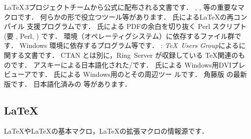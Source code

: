 \begin{KI}
 \LaTeX\,3プロジェクトチームから公式に配布される文書です．
 \AmSLaTeX, , 等の重要なマクロです．
 何らかの形で役立つツール等があります．
 氏による\LaTeX の再コンパイル
 支援プログラムです．
 氏による PDFの余白を切り抜く Perl スクリプト
 (要 \PDFTeX, Perl, \GS) です．
 環境（オペレーティグシステム）に依存するファイル群です．
 Windows 環境に依存するプログラム等です．
 : \emph{\TeX\ Users Group}によるに関する文書です．
 CTAN とは別に，Ring~Server が収録している \TeX 関連のものです．
 アスキーによる日本語化された\pTeX/\pLaTeX です．
 氏による Windows用DVIプレビューア\Dviout です．
  氏による Windows用の\pTeX とその周辺ツー
 ルです．
  角藤版 \pTeX の最新版です．
 日本語化済みの \GS 等があります．
\end{KI}



\subsection{\LaTeX}
{\LaTeX}や{\LaTeX}の基本マクロ，{\LaTeX}の拡張マクロの情報源です．

